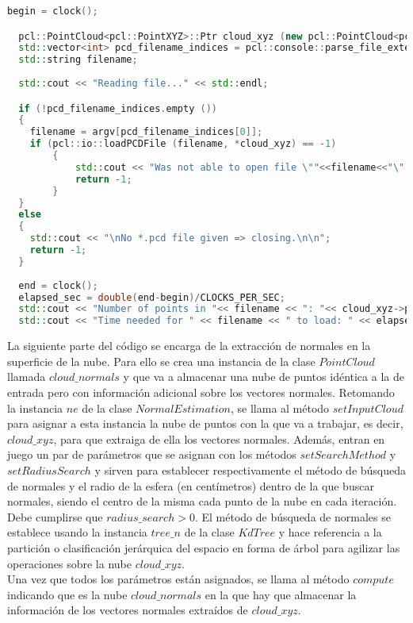 \begin{lstlisting}[language=C++,breaklines]
  begin = clock();

  pcl::PointCloud<pcl::PointXYZ>::Ptr cloud_xyz (new pcl::PointCloud<pcl::PointXYZ>);
  std::vector<int> pcd_filename_indices = pcl::console::parse_file_extension_argument (argc, argv, "pcd"); 
  std::string filename;
     
  std::cout << "Reading file..." << std::endl;

  if (!pcd_filename_indices.empty ())
  {
  	filename = argv[pcd_filename_indices[0]];
  	if (pcl::io::loadPCDFile (filename, *cloud_xyz) == -1) 
    	{
        	std::cout << "Was not able to open file \""<<filename<<"\".\n";
       		return -1;
    	}
  }
  else
  {
  	std::cout << "\nNo *.pcd file given => closing.\n\n";
  	return -1;
  }
  
  end = clock();
  elapsed_sec = double(end-begin)/CLOCKS_PER_SEC;
  std::cout << "Number of points in "<< filename << ": "<< cloud_xyz->points.size () <<std::endl; 
  std::cout << "Time needed for " << filename << " to load: " << elapsed_sec << " seconds"<< std::endl << std::endl; 
\end{lstlisting}
  
  
La siguiente parte del código se encarga de la extracción de normales en la superficie de la nube. Para ello se crea una instancia de la clase $PointCloud$ llamada $cloud\_normals$ y que va a almacenar una nube de puntos idéntica a la de entrada pero con información adicional sobre los vectores normales.
Retomando la instancia $ne$ de la clase $NormalEstimation$, se llama al método $setInputCloud$ para asignar a esta instancia la nube de puntos con la que va a trabajar, es decir, $cloud\_xyz$, para que extraiga de ella los vectores normales.
Además, entran en juego un par de parámetros que se asignan con los métodos $setSearchMethod$ y $setRadiusSearch$ y sirven para establecer respectivamente el método de búsqueda de normales y el radio de la esfera (en centímetros) dentro de la que buscar normales, siendo el centro de la misma cada punto de la nube en cada iteración. Debe cumplirse que $radius\_search>0.$
El método de búsqueda de normales se establece usando la instancia $tree\_n$ de la clase $KdTree$ y hace referencia a la partición o clasificación jerárquica del espacio en forma de árbol para agilizar las operaciones sobre la nube $cloud\_xyz$.\\
Una vez que todos los parámetros están asignados, se llama al método $compute$ indicando que es la nube $cloud\_normals$ en la que hay que almacenar la información de los vectores normales extraídos de $cloud\_xyz$.

